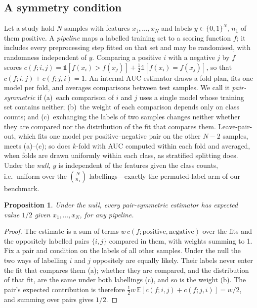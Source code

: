 \documentclass[10pt,letterpaper]{article}
\newtheorem{proposition}{Proposition}
\begin{document}
\subsection{A symmetry condition}
Let a study hold $N$ samples with features $x_1, \dots, x_N$ and labels $y \in \{0, 1\}^N$, $n_1$ of them
positive. A \emph{pipeline} maps a labelled training set to a scoring function $f$; it includes every
preprocessing step fitted on that set and may be randomised, with randomness independent of $y$. Comparing
a positive $i$ with a negative $j$ by $f$ scores $c(f; i, j) = \mathbb{1}[f(x_i) > f(x_j)] +
\tfrac12 \mathbb{1}[f(x_i) = f(x_j)]$, so that $c(f; i, j) + c(f; j, i) = 1$. An internal AUC estimator draws
a fold plan, fits one model per fold, and averages comparisons between test samples. We call it
\emph{pair-symmetric} if (a)~each comparison of $i$ and $j$ uses a single model whose training set contains
neither; (b)~the weight of each comparison depends only on class counts; and (c)~exchanging the labels of
two samples changes neither whether they are compared nor the distribution of the fit that compares them. Leave-pair-out, which
fits one model per positive--negative pair on the other $N - 2$ samples, meets (a)--(c); so does $k$-fold
with AUC computed within each fold and averaged, when folds are drawn uniformly within each class, as
stratified splitting does. Under the \emph{null}, $y$ is independent of the features given the class
counts, i.e.\ uniform over the $\binom{N}{n_1}$ labellings---exactly the permuted-label arm of our benchmark.

\begin{proposition}\label{prop:null}
Under the null, every pair-symmetric estimator has expected value $1/2$ given $x_1, \dots, x_N$, for any
pipeline.
\end{proposition}

\begin{proof}
The estimate is a sum of terms $w \, c(f; \text{positive}, \text{negative})$ over the fits and the
oppositely labelled pairs $\{i, j\}$ compared in them, with weights summing to 1. Fix a pair and condition on
the labels of all other samples. Under the null the two ways of labelling $i$ and $j$ oppositely are equally
likely. Their labels never enter the fit that compares them (a); whether they are compared, and the
distribution of that fit, are the same under both labellings (c), and so is the weight (b). The pair's expected contribution is therefore
$\tfrac12 w \, \mathbb{E}[c(f; i, j) + c(f; j, i)] = w/2$, and summing over pairs gives $1/2$.
\end{proof}
\end{document}
